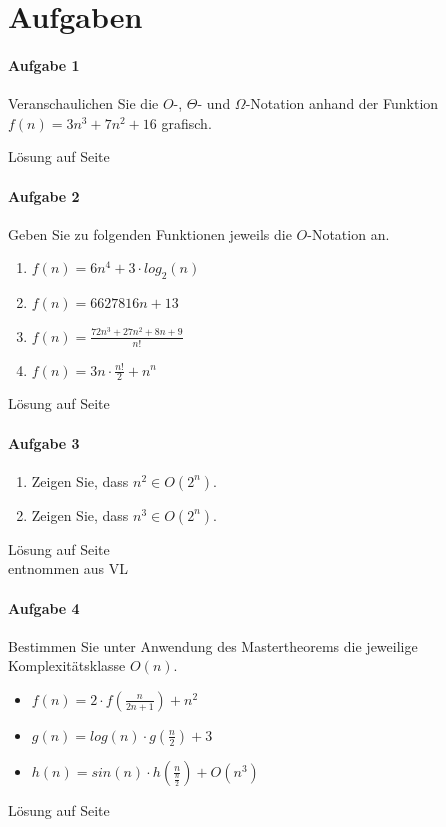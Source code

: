 \documentclass[11pt,a4paper]{scrartcl}
\begin{document}
\section*{Aufgaben}
\paragraph{Aufgabe 1} Veranschaulichen Sie die $O$-, $\Theta$- und $\Omega$-Notation anhand der Funktion $f(n) = 3n^{3} + 7n^{2} + 16$ grafisch. 
\begin{flushright}
Lösung auf Seite \pageref{a1:lsg}
\end{flushright}
\paragraph{Aufgabe 2} Geben Sie zu folgenden Funktionen jeweils die $O$-Notation an.
\begin{enumerate}
\item $f(n) = 6n^{4} + 3 \cdot log_{2}(n)$
\item $f(n) = 6627816n + 13$
\item $f(n) = \frac{72n^{3} + 27n^{2} + 8n + 9}{n!}$
\item $f(n) = 3n \cdot \frac{n!}{2} + n^n $
\end{enumerate}
\begin{flushright}
Lösung auf Seite \pageref{a2:lsg}
\end{flushright}
\paragraph{Aufgabe 3}
\begin{enumerate}
\item Zeigen Sie, dass $n^{2} \in O(2^n)$.
\item Zeigen Sie, dass $n^{3} \in O(2^n)$.
\end{enumerate}
\begin{flushright}
Lösung auf Seite \pageref{a3:lsg} \\
entnommen aus VL
\end{flushright}
\paragraph{Aufgabe 4}
Bestimmen Sie unter Anwendung des Mastertheorems die jeweilige Komplexitätsklasse $O(n)$.
\begin{itemize}
\item $f(n) = 2 \cdot f(\frac{n}{2n+1}) + n^{2}$
\item $g(n) = log(n) \cdot g(\frac{n}{2}) + 3$
\item $h(n) = sin(n) \cdot h(\frac{n}{\frac{n}{2}}) + O(n^{3})$
\end{itemize}
\begin{flushright}
Lösung auf Seite \pageref{a4:lsg} \\
\end{flushright}
\end{document}
